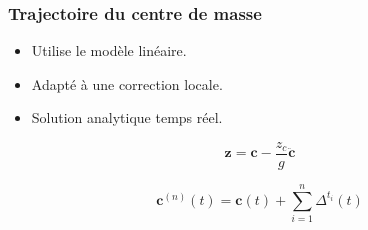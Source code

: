 \documentclass[14pt,utf8,hyperref={pdfpagelabels=false}]{beamer}
\begin{document}
\begin{slideAction}
  \frametitle{Trajectoire du centre de masse}


  \begin{changeleftmargin}{1.1cm}
    \begin{itemize}
    \item Utilise le modèle linéaire.
    \item Adapté à une correction locale.
    \item Solution analytique temps réel.
    \end{itemize}
    
    \begin{equation*}
      \mathbf{z} = \mathbf{c} - \frac{z_c}{g} \ddot{\mathbf{c}}
    \end{equation*}
    
    \begin{equation*}
      \mathbf{c}^{(n)}(t) = \mathbf{c}(t)  + \sum_{i=1}^n \Delta^{t_i}(t)
    \end{equation*}
  \end{changeleftmargin}
\end{slideAction}



\end{document}
